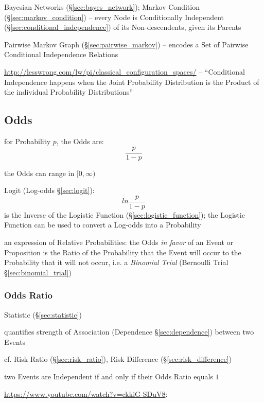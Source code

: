 \fist Bayesian Networks (\S\ref{sec:bayes_network});
Markov Condition (\S\ref{sec:markov_condition}) -- every Node is Conditionally
Independent (\S\ref{sec:conditional_independence}) of its Non-descendents, given
its Parents

\fist Pairwise Markov Graph (\S\ref{sec:pairwise_markov}) -- encodes a Set
of Pairwise Conditional Independence Relations

\url{http://lesswrong.com/lw/pi/classical_configuration_spaces/}
-- ``Conditional Independence happens when the Joint Probability Distribution
is the Product of the individual Probability Distributions''



\subsection{Odds}\label{sec:odds}

for Probability $p$, the Odds are:
\[
  \frac{p}{1-p}
\]

the Odds can range in $[0, \infty)$

\fist Logit (Log-odds \S\ref{sec:logit}):
\[
  ln \frac{p}{1-p}
\]
is the Inverse of the Logistic Function (\S\ref{sec:logistic_function}); the
Logistic Function can be used to convert a Log-odds into a Probability

an expression of Relative Probabilities: the Odds \emph{in favor} of an Event or
Proposition is the Ratio of the Probability that the Event will occur to the
Probability that it will not occur, i.e. a \emph{Binomial Trial}
(Bernoulli Trial \S\ref{sec:binomial_trial})



\subsubsection{Odds Ratio}\label{sec:odds_ratio}

Statistic (\S\ref{sec:statistic})

quantifies strength of Association (Dependence \S\ref{sec:dependence}) between
two Events

\fist cf. Risk Ratio (\S\ref{sec:risk_ratio}), Risk Difference
(\S\ref{sec:risk_difference})

two Events are Independent if and only if their Odds Ratio equals $1$

\url{https://www.youtube.com/watch?v=ckkiG-SDuV8}:

